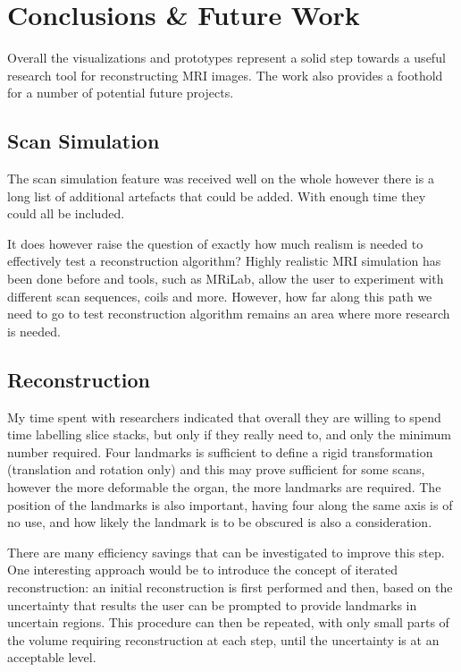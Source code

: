 \chapter{Conclusions \& Future Work}
Overall the visualizations and prototypes represent a solid step towards a useful research tool for reconstructing MRI images. The work also provides a foothold for a number of potential future projects.

\section{Scan Simulation}
The scan simulation feature was received well on the whole however there is a long list of additional artefacts that could be added. With enough time they could all be included.

It does however raise the question of exactly how much realism is needed to effectively test a reconstruction algorithm? Highly realistic MRI simulation has been done before and tools, such as MRiLab\cite{mrilab}, allow the user to experiment with different scan sequences, coils and more. However, how far along this path we need to go to test reconstruction algorithm remains an area where more research is needed.

\section{Reconstruction}
My time spent with researchers indicated that overall they are willing to spend time labelling slice stacks, but only if they really need to, and only the minimum number required. Four landmarks is sufficient to define a rigid transformation (translation and rotation only) and this may prove sufficient for some scans, however the more deformable the organ, the more landmarks are required. The position of the landmarks is also important, having four  along the same axis is of no use, and how likely the landmark is to be obscured is also a consideration.

There are many efficiency savings that can be investigated to improve this step. One interesting approach would be to introduce the concept of iterated reconstruction: an initial reconstruction is first performed and then, based on the uncertainty that results the user can be prompted to provide landmarks in uncertain regions. This procedure can then be repeated, with only small parts of the volume requiring reconstruction at each step, until the uncertainty is at an acceptable level.

